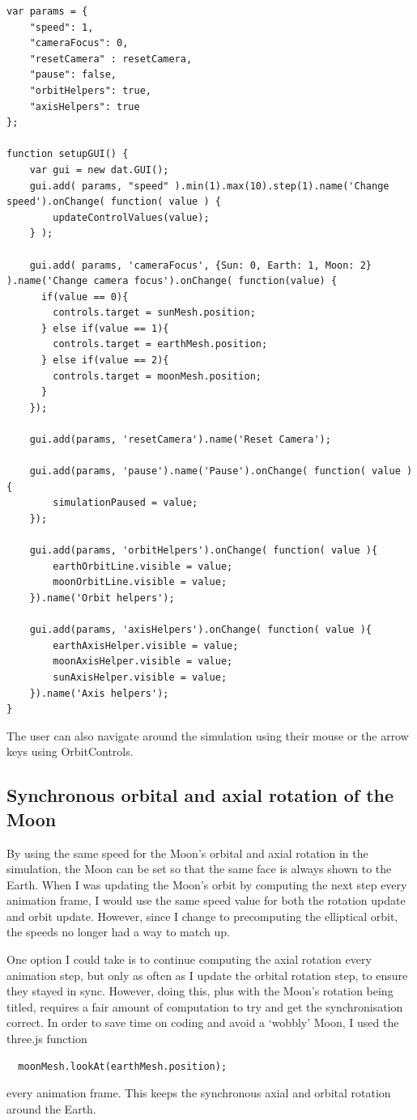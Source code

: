 \documentclass[12pt]{article}
\begin{document}
\begin{lstlisting}
var params = {
    "speed": 1,
    "cameraFocus": 0,
    "resetCamera" : resetCamera,
    "pause": false,
    "orbitHelpers": true,
    "axisHelpers": true
};

function setupGUI() {
    var gui = new dat.GUI();
    gui.add( params, "speed" ).min(1).max(10).step(1).name('Change speed').onChange( function( value ) {
        updateControlValues(value);
    } );

    gui.add( params, 'cameraFocus', {Sun: 0, Earth: 1, Moon: 2} ).name('Change camera focus').onChange( function(value) {
      if(value == 0){
        controls.target = sunMesh.position;
      } else if(value == 1){
        controls.target = earthMesh.position;
      } else if(value == 2){
        controls.target = moonMesh.position;
      }
    });

    gui.add(params, 'resetCamera').name('Reset Camera');

    gui.add(params, 'pause').name('Pause').onChange( function( value ){
        simulationPaused = value;
    });
    
    gui.add(params, 'orbitHelpers').onChange( function( value ){
        earthOrbitLine.visible = value;
        moonOrbitLine.visible = value;
    }).name('Orbit helpers');

    gui.add(params, 'axisHelpers').onChange( function( value ){
        earthAxisHelper.visible = value;
        moonAxisHelper.visible = value;
        sunAxisHelper.visible = value;
    }).name('Axis helpers');    
}
\end{lstlisting}

The user can also navigate around the simulation using their mouse or the arrow keys using OrbitControls\cite{orbitcontrols}.

\subsection{Synchronous orbital and axial rotation of the Moon}
By using the same speed for the Moon's orbital and axial rotation in the simulation, the Moon can be set so that the same face is always shown to the Earth. When I was updating the Moon's orbit by computing the next step every animation frame, I would use the same speed value for both the rotation update and orbit update. However, since I change to precomputing the elliptical orbit, the speeds no longer had a way to match up.

One option I could take is to continue computing the axial rotation every animation step, but only as often as I update the orbital rotation step, to ensure they stayed in sync. However, doing this, plus with the Moon's rotation being titled, requires a fair amount of computation to try and get the synchronisation correct. In order to save time on coding and avoid a `wobbly' Moon, I used the three.js function 
\begin{lstlisting}
  moonMesh.lookAt(earthMesh.position);\end{lstlisting}
 every animation frame. This keeps the synchronous axial and orbital rotation around the Earth.
 
\end{document}
